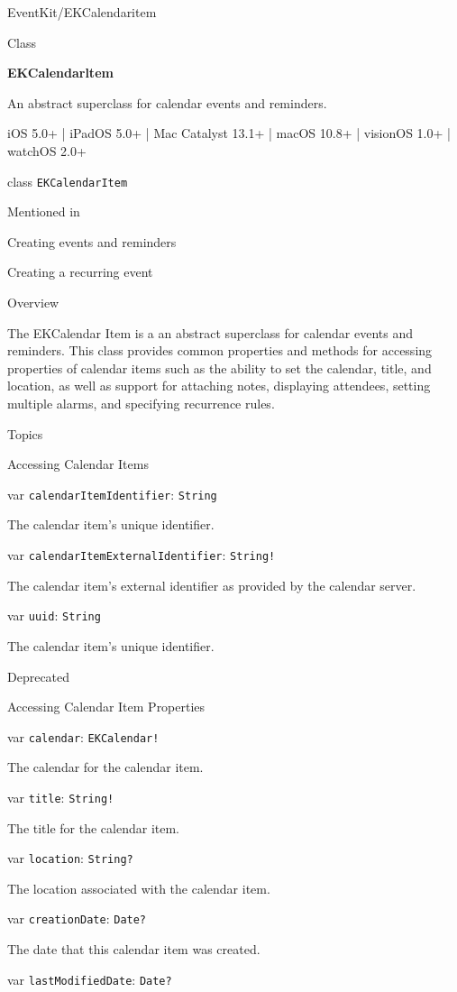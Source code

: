 \documentclass{article}
\title{}
\author{}
\date{}
\begin{document}
EventKit/EKCalendaritem

Class

\textbf{EKCalendarltem}

An abstract superclass for calendar events and reminders.

iOS 5.0+ | iPadOS 5.0+ | Mac Catalyst 13.1+ | macOS 10.8+ | visionOS 1.0+ | watchOS 2.0+

class \texttt{EKCalendarItem}

Mentioned in

Creating events and reminders

Creating a recurring event

Overview

The EKCalendar Item is a an abstract superclass for calendar events and reminders. This class provides common properties and methods for accessing properties of calendar items such as the ability to set the calendar, title, and location, as well as support for attaching notes, displaying attendees, setting multiple alarms, and specifying recurrence rules.

Topics

Accessing Calendar Items

var \texttt{calendarItemIdentifier}: \texttt{String}

The calendar item's unique identifier.

var \texttt{calendarItemExternalIdentifier}: \texttt{String!}

The calendar item's external identifier as provided by the calendar server.

var \texttt{uuid}: \texttt{String}

The calendar item's unique identifier.

Deprecated

Accessing Calendar Item Properties

var \texttt{calendar}: \texttt{EKCalendar!}

The calendar for the calendar item.

var \texttt{title}: \texttt{String!}

The title for the calendar item.

var \texttt{location}: \texttt{String?}

The location associated with the calendar item.

var \texttt{creationDate}: \texttt{Date?}

The date that this calendar item was created.

var \texttt{lastModifiedDate}: \texttt{Date?}
\end{document}
